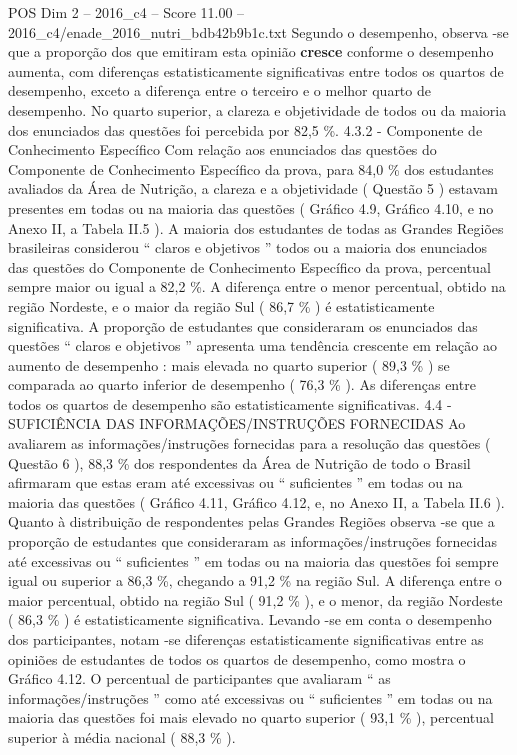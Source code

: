 \begin{textsample}{POS Dim 2 – 2016\_c4 – Score 11.00 – 2016\_c4/enade\_2016\_nutri\_bdb42b9b1c.txt}
Segundo o desempenho, observa -se que a proporção dos que emitiram esta opinião \textbf{cresce} conforme o desempenho aumenta, com diferenças estatisticamente significativas entre todos os quartos de desempenho, exceto a diferença entre o terceiro e o melhor quarto de desempenho.
No quarto superior, a clareza e objetividade de todos ou da maioria dos enunciados das questões foi percebida por 82,5 \%. 4.3.2 - Componente de Conhecimento Específico Com relação aos enunciados das questões do Componente de Conhecimento Específico da prova, para 84,0 \% dos estudantes avaliados da Área de Nutrição, a clareza e a objetividade ( Questão 5 ) estavam presentes em todas ou na maioria das questões ( Gráfico 4.9, Gráfico 4.10, e no Anexo II, a Tabela II.5 ).
A maioria dos estudantes de todas as Grandes Regiões brasileiras considerou “ claros e objetivos ” todos ou a maioria dos enunciados das questões do Componente de Conhecimento Específico da prova, percentual sempre maior ou igual a 82,2 \%.
A diferença entre o menor percentual, obtido na região Nordeste, e o maior da região Sul ( 86,7 \% ) é estatisticamente significativa.
A proporção de estudantes que consideraram os enunciados das questões “ claros e objetivos ” apresenta uma tendência crescente em relação ao aumento de desempenho : mais elevada no quarto superior ( 89,3 \% ) se comparada ao quarto inferior de desempenho ( 76,3 \% ).
As diferenças entre todos os quartos de desempenho são estatisticamente significativas. 4.4 - SUFICIÊNCIA DAS INFORMAÇÕES/INSTRUÇÕES FORNECIDAS Ao avaliarem as informações/instruções fornecidas para a resolução das questões ( Questão 6 ), 88,3 \% dos respondentes da Área de Nutrição de todo o Brasil afirmaram que estas eram até excessivas ou “ suficientes ” em todas ou na maioria das questões ( Gráfico 4.11, Gráfico 4.12, e, no Anexo II, a Tabela II.6 ).
Quanto à distribuição de respondentes pelas Grandes Regiões observa -se que a proporção de estudantes que consideraram as informações/instruções fornecidas até excessivas ou “ suficientes ” em todas ou na maioria das questões foi sempre igual ou superior a 86,3 \%, chegando a 91,2 \% na região Sul.
A diferença entre o maior percentual, obtido na região Sul ( 91,2 \% ), e o menor, da região Nordeste ( 86,3 \% ) é estatisticamente significativa.
Levando -se em conta o desempenho dos participantes, notam -se diferenças estatisticamente significativas entre as opiniões de estudantes de todos os quartos de desempenho, como mostra o Gráfico 4.12.
O percentual de participantes que avaliaram “ as informações/instruções ” como até excessivas ou “ suficientes ” em todas ou na maioria das questões foi mais elevado no quarto superior ( 93,1 \% ), percentual superior à média nacional ( 88,3 \% ).

\end{textsample}
